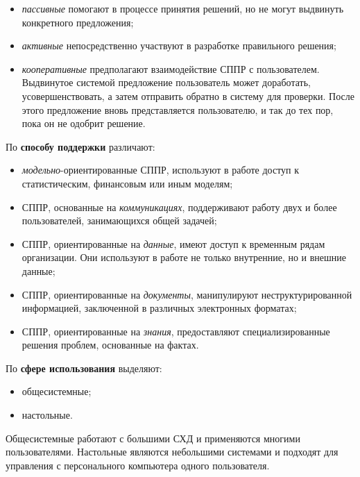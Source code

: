 \begin{itemize}
  \item \textit{пассивные} помогают в процессе принятия решений, но не могут выдвинуть конкретного предложения;
  \item \textit{активные} непосредственно участвуют в разработке правильного решения;
  \item \textit{кооперативные} предполагают взаимодействие СППР с пользователем.
    Выдвинутое системой предложение пользователь может доработать, усовершенствовать,
    а затем отправить обратно в систему для проверки. После этого
    предложение вновь представляется пользователю, и так до тех пор,
    пока он не одобрит решение.
\end{itemize}

По \textbf{способу поддержки} различают:
\begin{itemize}
  \item \textit{модельно}-ориентированные СППР, используют в работе доступ к статистическим,
    финансовым или иным моделям;
  \item СППР, основанные на \textit{коммуникациях}, поддерживают работу двух и более пользователей,
    занимающихся общей задачей;
  \item СППР, ориентированные на \textit{данные}, имеют доступ к временным рядам организации.
    Они используют в работе не только внутренние, но и внешние данные;
  \item СППР, ориентированные на \textit{документы}, манипулируют неструктурированной информацией,
    заключенной в различных электронных форматах;
  \item СППР, ориентированные на \textit{знания}, предоставляют специализированные решения проблем,
    основанные на фактах.
\end{itemize}

По \textbf{сфере использования} выделяют:
\begin{itemize}
  \item общесистемные;
  \item настольные.
\end{itemize}

Общесистемные работают с большими СХД и применяются многими пользователями.
Настольные являются небольшими системами и подходят для управления с
персонального компьютера одного пользователя.

\pagebreak